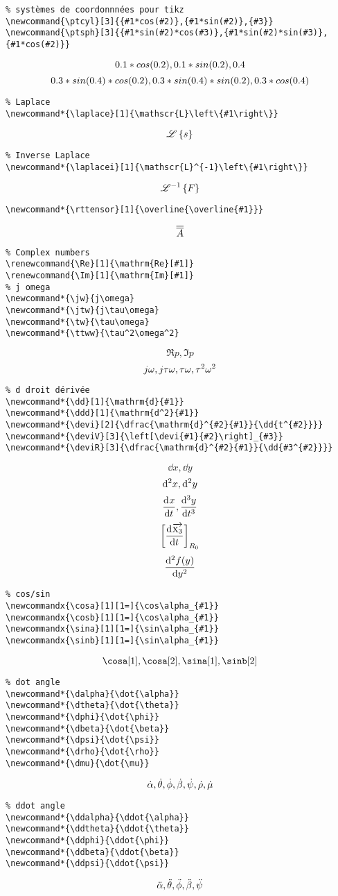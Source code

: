 \documentclass[a4paper,9pt]{article}
\begin{document}
\begin{verbatim}
% systèmes de coordonnnées pour tikz
\newcommand{\ptcyl}[3]{{#1*cos(#2)},{#1*sin(#2)},{#3}}
\newcommand{\ptsph}[3]{{#1*sin(#2)*cos(#3)},{#1*sin(#2)*sin(#3)},{#1*cos(#2)}}
\end{verbatim}
\[
    \ptcyl{0.1}{0.2}{0.4}
\]
\[
    \ptsph{0.3}{0.4}{0.2}
\]

\begin{verbatim}
% Laplace 
\newcommand*{\laplace}[1]{\mathscr{L}\left\{#1\right\}}
\end{verbatim}
\[
    \laplace{s}
\]
\begin{verbatim}
% Inverse Laplace
\newcommand*{\laplacei}[1]{\mathscr{L}^{-1}\left\{#1\right\}}
\end{verbatim}
\[
    \laplacei{F}
\]
\begin{verbatim}
\newcommand*{\rttensor}[1]{\overline{\overline{#1}}}
\end{verbatim}
\[
    \rttensor{A}
\]

\begin{verbatim}
% Complex numbers
\renewcommand{\Re}[1]{\mathrm{Re}[#1]}
\renewcommand{\Im}[1]{\mathrm{Im}[#1]}
% j omega
\newcommand*{\jw}{j\omega}
\newcommand*{\jtw}{j\tau\omega}
\newcommand*{\tw}{\tau\omega}
\newcommand*{\ttww}{\tau^2\omega^2}
\end{verbatim}
\[
    \Re{p},\Im{p}
\]
\[
    \jw,\jtw,\tw,\ttww
\]
\begin{verbatim}
% d droit dérivée
\newcommand*{\dd}[1]{\mathrm{d}{#1}}
\newcommand*{\ddd}[1]{\mathrm{d^2}{#1}}
\newcommand*{\devi}[2]{\dfrac{\mathrm{d}^{#2}{#1}}{\dd{t^{#2}}}}
\newcommand*{\deviV}[3]{\left[\devi{#1}{#2}\right]_{#3}}
\newcommand*{\deviR}[3]{\dfrac{\mathrm{d}^{#2}{#1}}{\dd{#3^{#2}}}}
\end{verbatim}
\[
    \dd{x},\dd{y}
\]
\[
    \ddd{x},\ddd{y}
\]
\[
    \devi{x}{},\devi{y}{3}
\]
\[
    \deviV{\xx{3}}{}{R_0}
\]
\[
    \deviR{f(y)}{2}{y}
\]
\clearpage
\begin{verbatim}
% cos/sin
\newcommandx{\cosa}[1][1=]{\cos\alpha_{#1}}
\newcommandx{\cosb}[1][1=]{\cos\alpha_{#1}}
\newcommandx{\sina}[1][1=]{\sin\alpha_{#1}}
\newcommandx{\sinb}[1][1=]{\sin\alpha_{#1}}
\end{verbatim}
\[
    \cosa[1],\cosa[2],\sina[1],\sinb[2]
\]

\begin{verbatim}
% dot angle
\newcommand*{\dalpha}{\dot{\alpha}}
\newcommand*{\dtheta}{\dot{\theta}}
\newcommand*{\dphi}{\dot{\phi}}
\newcommand*{\dbeta}{\dot{\beta}}
\newcommand*{\dpsi}{\dot{\psi}}
\newcommand*{\drho}{\dot{\rho}}
\newcommand*{\dmu}{\dot{\mu}}
\end{verbatim}
\[
    \dalpha,\dtheta,\dphi,\dbeta,\dpsi,\drho,\dmu
\]
\begin{verbatim}
% ddot angle
\newcommand*{\ddalpha}{\ddot{\alpha}}
\newcommand*{\ddtheta}{\ddot{\theta}}
\newcommand*{\ddphi}{\ddot{\phi}}
\newcommand*{\ddbeta}{\ddot{\beta}}
\newcommand*{\ddpsi}{\ddot{\psi}}
\end{verbatim}
\[
    \ddalpha,\ddtheta,\ddphi,\ddbeta,\ddpsi
\]
\end{document}
